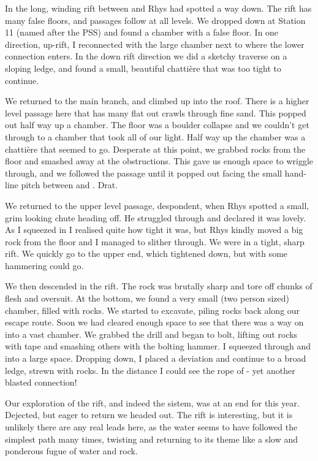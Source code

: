 In the long, winding rift between  and  Rhys had spotted a way down. The rift has many false floors, and passages follow at all levels. We dropped down at Station 11 (named after the PSS) and found a chamber with a false floor. In one direction, up-rift, I reconnected with the large chamber next to  where the lower  connection enters. In the down rift direction we did a sketchy traverse on a sloping ledge, and found a small, beautiful chattière that was too tight to continue.
 
We returned to the main branch, and climbed up into the roof. There is a higher level passage here that has many flat out crawls through fine sand. This popped out half way up a chamber. The floor was a boulder collapse and we couldn’t get through to a chamber that took all of our light. Half way up the chamber was a chattière that seemed to go. Desperate at this point, we grabbed rocks from the floor and smashed away at the obstructions. This gave us enough space to wriggle through, and we followed the passage until it popped out facing the small hand-line pitch between  and . Drat.
 
We returned to the upper level passage, despondent, when Rhys spotted a small, grim looking chute heading off. He struggled through and declared it was lovely. As I squeezed in I realised quite how tight it was, but Rhys kindly moved a big rock from the floor and I managed to slither through. We were in a tight, sharp rift. We quickly go to the upper end, which tightened down, but with some hammering could go. 
 
We then descended in the rift. The rock was brutally sharp and tore off chunks of flesh and oversuit. At the bottom, we found a very small (two person sized) chamber, filled with rocks. We started to excavate, piling rocks back along our escape route. Soon we had cleared enough space to see that there was a way on into a vast chamber. We grabbed the drill and began to bolt, lifting out rocks with tape and smashing others with the bolting hammer. I squeezed through and into a large space. Dropping down, I placed a deviation and continue to a broad ledge, strewn with rocks. In the distance I could see the rope of  - yet another blasted connection!
 
Our exploration of the rift, and indeed the sistem, was at an end for this year. Dejected, but eager to return we headed out. The rift is interesting, but it is unlikely there are any real leads here, as the water seems to have followed the simplest path many times, twisting and returning to its theme like a slow and ponderous fugue of water and rock.

